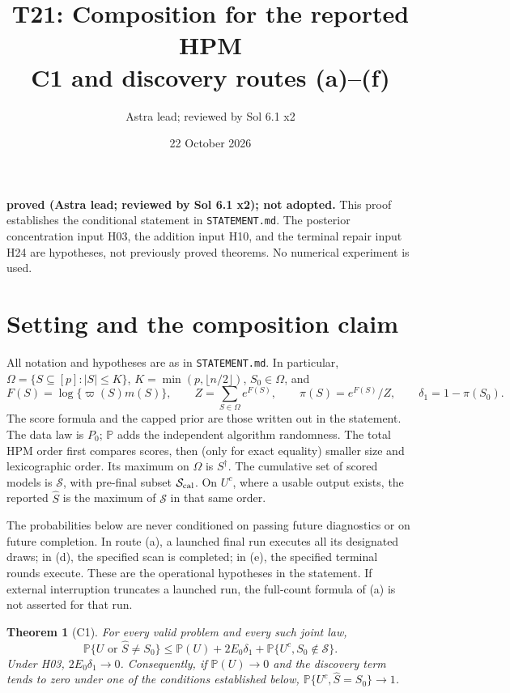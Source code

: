 ﻿\documentclass[11pt]{article}
\title{T21: Composition for the reported HPM\\\large C1 and discovery routes (a)--(f)}
\author{Astra lead; reviewed by Sol 6.1 x2}
\date{22 October 2026}
\newtheorem{theorem}{Theorem}
\newcommand{\Pp}{\mathbb P}
\newcommand{\1}{\mathbf 1}
\newcommand{\Sc}{\mathcal S}
\newcommand{\Om}{\Omega}
\begin{document}
\maketitle
\noindent\textbf{proved (Astra lead; reviewed by Sol 6.1 x2); not adopted.}
This proof establishes the conditional statement in \texttt{STATEMENT.md}.
The posterior concentration input H03, the addition input H10, and the terminal
repair input H24 are hypotheses, not previously proved theorems.
No numerical experiment is used.

\section{Setting and the composition claim}
All notation and hypotheses are as in \texttt{STATEMENT.md}. In particular,
\(\Om=\{S\subseteq[p]:|S|\le K\}\), \(K=\min(p,\lfloor n/2\rfloor)\),
\(S_0\in\Om\), and
\[
 F(S)=\log\{\varpi(S)m(S)\},\qquad
 Z=\sum_{S\in\Om}e^{F(S)},\qquad
 \pi(S)=e^{F(S)}/Z,\qquad \delta_1=1-\pi(S_0).
\]
The score formula and the capped prior are those written out in the statement.
The data law is \(P_0\); \(\Pp\) adds the independent algorithm randomness.
The total HPM order first compares scores, then (only for exact equality)
smaller size and lexicographic order. Its maximum on \(\Om\) is \(S^\dagger\).
The cumulative set of scored models is \(\Sc\), with pre-final subset
\(\Sc_{\rm cal}\). On \(U^c\), where a usable output exists, the reported
\(\widehat S\) is the maximum of \(\Sc\) in that same order.

The probabilities below are never conditioned on passing future diagnostics
or on future completion. In route (a), a launched final run executes all its
designated draws; in (d), the specified scan is completed; in (e), the specified
terminal rounds execute. These are the operational hypotheses in the statement.
If external interruption truncates a launched run, the full-count formula of
(a) is not asserted for that run.

\begin{theorem}[C1]
For every valid problem and every such joint law,
\begin{equation}\label{eq:C1}
 \Pp\{U\text{ or }\widehat S\ne S_0\}
 \le \Pp(U)+2E_0\delta_1+\Pp\{U^c,S_0\notin\Sc\}.
\end{equation}
Under H03, \(2E_0\delta_1\to0\). Consequently, if \(\Pp(U)\to0\)
and the discovery term tends to zero under one of the conditions established
below, \(\Pp\{U^c,\widehat S=S_0\}\to1\).
\end{theorem}
\end{document}
